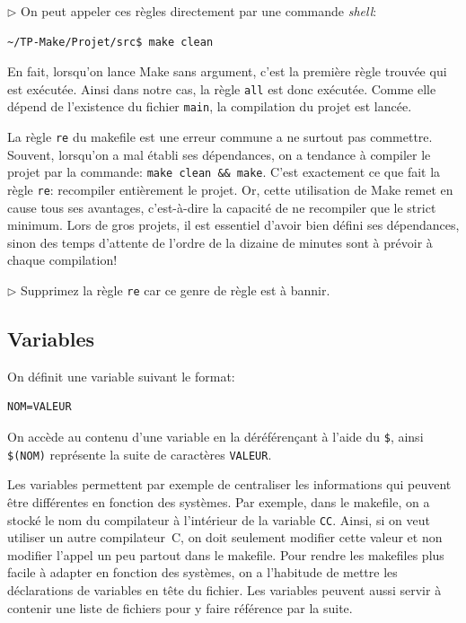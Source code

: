 \documentclass[11pt,a4paper]{article}
\newcommand{\must}{\noindent $\triangleright$ \xspace}
\begin{document}
\medskip

\must On peut appeler ces règles directement par une commande \emph{shell}:
{\small
\begin{verbatim}
~/TP-Make/Projet/src$ make clean
\end{verbatim}
}

En fait, lorsqu'on lance \textsf{Make} sans argument, c'est la
première règle trouvée qui est exécutée. Ainsi dans notre cas, la
règle \texttt{all} est donc exécutée. Comme elle dépend de l'existence
du fichier \texttt{main}, la compilation du projet est lancée.

La règle \texttt{re} du makefile est une erreur commune a ne
surtout pas commettre. Souvent, lorsqu'on a mal établi ses
dépendances, on a tendance à compiler le projet par la commande:
{\small \verb!make clean && make!}.  C'est exactement ce que fait la
règle \texttt{re}: recompiler entièrement le projet. Or, cette
utilisation de \textsf{Make} remet en cause tous ses avantages,
c'est-à-dire la capacité de ne recompiler que le strict minimum. Lors
de gros projets, il est essentiel d'avoir bien défini ses dépendances,
sinon des temps d'attente de l'ordre de la dizaine de minutes sont à
prévoir à chaque compilation!

\medskip

\must Supprimez la règle \texttt{re} car ce genre de règle est à bannir.

\subsection{Variables}

\noindent On définit une variable suivant le format:
{\small
\begin{verbatim}
NOM=VALEUR
\end{verbatim}
}
\noindent On accède au contenu d'une variable en la déréférençant à
l'aide du \verb!$!, ainsi {\small \verb!$(NOM)!} représente la suite
de caractères \texttt{\small VALEUR}.

Les variables permettent par exemple de centraliser les informations
qui peuvent être différentes en fonction des systèmes. Par exemple,
dans le makefile, on a stocké le nom du compilateur à
l'intérieur de la variable \texttt{CC}. Ainsi, si on veut utiliser un
autre compilateur~C, on doit seulement modifier cette valeur et non
modifier l'appel un peu partout dans le makefile. Pour rendre
les makefiles plus facile à adapter en fonction des systèmes,
on a l'habitude de mettre les déclarations de variables en tête du
fichier. Les variables peuvent aussi servir à contenir une liste de
fichiers pour y faire référence par la suite.
\end{document}
